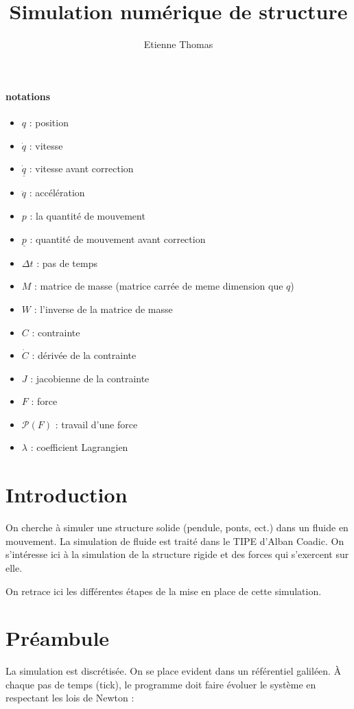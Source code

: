 \documentclass[11pt, letterpaper]{report}
\title{Simulation numérique de structure}
\author{Etienne Thomas}
\begin{document}
    \maketitle
    \tableofcontents
    \paragraph{notations}
    \begin{itemize}
        \item $q$ : position
        \item $\dot{q}$ : vitesse
        \item $\underline{\dot{q}}$ : vitesse avant correction
        \item $\ddot{q}$ : accélération
        \item $p$ : la quantité de mouvement
        \item $\underline{p}$ : quantité de mouvement avant correction
        \item $\Delta t$ : pas de temps
        \item $M$ : matrice de masse (matrice carrée de meme dimension que $q$)
        \item $W$ : l'inverse de la matrice de masse
        \item $C$ : contrainte
        \item $\dot{C}$ : dérivée de la contrainte
        \item $J$ : jacobienne de la contrainte
        \item $F$ : force
        \item $\mathcal{P}(F)$ : travail d'une force
        \item $\lambda$ : coefficient Lagrangien
    \end{itemize}

    \section*{Introduction}
    On cherche à simuler une structure solide (pendule, ponts, ect.) dans un fluide en mouvement.
    La simulation de fluide est traité dans le TIPE d'Alban Coadic.
    On s'intéresse ici à la simulation de la structure rigide et des forces qui s'exercent sur elle.

    On retrace ici les différentes étapes de la mise en place de cette simulation.

    \section{Préambule}\label{sec:preambule}
    La simulation est discrétisée.
    On se place evident dans un référentiel galiléen.
    À chaque pas de temps (tick), le programme doit faire évoluer le système en respectant les lois de Newton :
\end{document}
